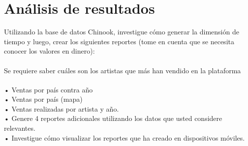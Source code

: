 \documentclass[12pt,letterpaper]{article}
\begin{document}
\section{Análisis de resultados}
Utilizando la base de datos Chinook, investigue cómo generar la dimensión de tiempo y luego, crear los
siguientes reportes (tome en cuenta que se necesita conocer los valores en dinero):
\\\\Se requiere saber cuáles son los artistas que más han vendido en la plataforma
\\\\• Ventas por país contra año
\\• Ventas por país (mapa)
\\• Ventas realizadas por artista y año.
\\• Genere 4 reportes adicionales utilizando los datos que usted considere relevantes.
\\• Investigue cómo visualizar los reportes que ha creado en dispositivos móviles.
\end{document}
